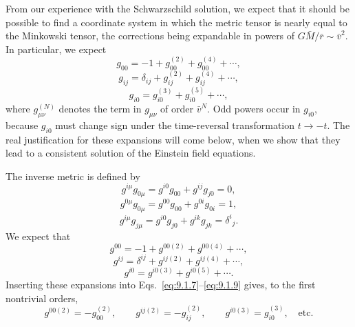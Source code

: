 From our experience with the Schwarzschild solution, we expect that it
should be possible to find a coordinate system in which the metric tensor is
nearly equal to the Minkowski tensor, the corrections being expandable in
powers of \(G\bar M/\bar r\sim\bar v^2\). In particular, we expect
\begin{equation}
  g_{00}=-1+g_{00}^{(2)}+g_{00}^{(4)}+\cdots,
  \tag{9.1.4}\label{eq:9.1.4}
\end{equation}
\begin{equation}
  g_{ij}=\delta_{ij}+g_{ij}^{(2)}+g_{ij}^{(4)}+\cdots,
  \tag{9.1.5}\label{eq:9.1.5}
\end{equation}
\begin{equation}
  g_{i0}=g_{i0}^{(3)}+g_{i0}^{(5)}+\cdots,
  \tag{9.1.6}\label{eq:9.1.6}
\end{equation}
where \(g_{\mu\nu}^{(N)}\) denotes the term in \(g_{\mu\nu}\) of order
\(\bar v^N\). Odd powers occur in \(g_{i0}\), because \(g_{i0}\) must change
sign under the time-reversal transformation \(t\to-t\). The real
justification for these expansions will come below, when we show that they
lead to a consistent solution of the Einstein field equations.

The inverse metric is defined by
\begin{equation}
  g^{i\mu}g_{0\mu}=g^{i0}g_{00}+g^{ij}g_{j0}=0,
  \tag{9.1.7}\label{eq:9.1.7}
\end{equation}
\begin{equation}
  g^{0\mu}g_{0\mu}=g^{00}g_{00}+g^{0i}g_{0i}=1,
  \tag{9.1.8}\label{eq:9.1.8}
\end{equation}
\begin{equation}
  g^{i\mu}g_{j\mu}=g^{i0}g_{j0}+g^{ik}g_{jk}=\delta^i{}_j.
  \tag{9.1.9}\label{eq:9.1.9}
\end{equation}
We expect that
\begin{equation}
  g^{00}=-1+g^{00(2)}+g^{00(4)}+\cdots,
  \tag{9.1.10}\label{eq:9.1.10}
\end{equation}
\begin{equation}
  g^{ij}=\delta^{ij}+g^{ij(2)}+g^{ij(4)}+\cdots,
  \tag{9.1.11}\label{eq:9.1.11}
\end{equation}
\begin{equation}
  g^{i0}=g^{i0(3)}+g^{i0(5)}+\cdots.
  \tag{9.1.12}\label{eq:9.1.12}
\end{equation}
Inserting these expansions into Eqs.~\eqref{eq:9.1.7}--\eqref{eq:9.1.9}
gives, to the first nontrivial orders,
\begin{equation}
  g^{00(2)}=-g_{00}^{(2)},\qquad
  g^{ij(2)}=-g_{ij}^{(2)},\qquad
  g^{i0(3)}=g_{i0}^{(3)},\quad\text{etc.}
  \tag{9.1.13}\label{eq:9.1.13}
\end{equation}

